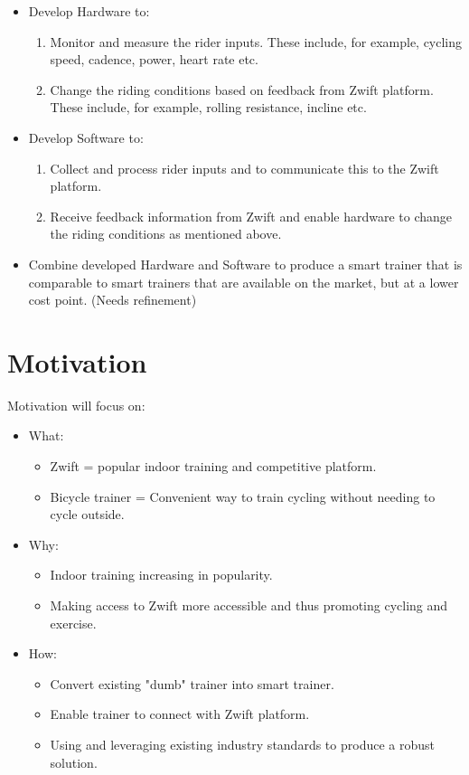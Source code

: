\begin{itemize}
	\item Develop Hardware to:
	\begin{enumerate}
		\item Monitor and measure the rider inputs. These include, for example, cycling speed, cadence, power, heart rate etc.
		\item Change the riding conditions based on feedback from Zwift platform. These include, for example, rolling resistance, incline etc.
	\end{enumerate}
	
	\item Develop Software to:
	\begin{enumerate}
		\item Collect and process rider inputs and to communicate this to the Zwift platform.
		\item Receive feedback information from Zwift and enable hardware to change the riding conditions as mentioned above.
	\end{enumerate}
	\item Combine developed Hardware and Software to produce a smart trainer that is comparable to smart trainers that are available on the market, but at a lower cost point. (Needs refinement)
\end{itemize} %

\newpage

\section{Motivation}

Motivation will focus on:
\begin{itemize}
	\item What:
	\begin{itemize}
		\item Zwift = popular indoor training and competitive platform.
		\item Bicycle trainer = Convenient way to train cycling without needing to cycle outside.
	\end{itemize}
	\item Why:
	\begin{itemize}
		\item Indoor training increasing in popularity.
		\item Making access to Zwift more accessible and thus promoting cycling and exercise. 
	\end{itemize}
	\item How:
	\begin{itemize}
		\item Convert existing "dumb" trainer into smart trainer.
		\item Enable trainer to connect with Zwift platform.
		\item Using and leveraging existing industry standards to produce a robust solution.
	\end{itemize}
	
\end{itemize}